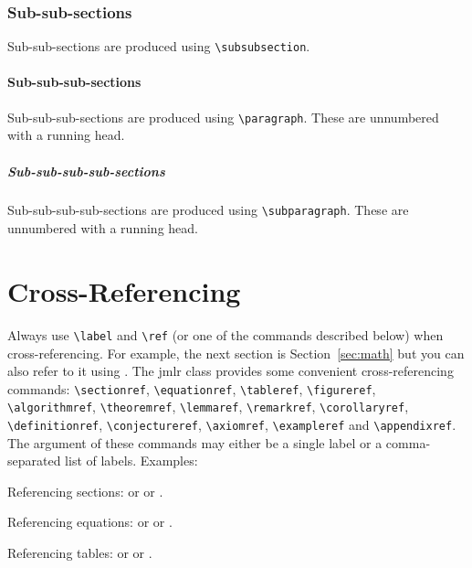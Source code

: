 \documentclass[pmlr,twocolumn,10pt]{jmlr} %
\begin{document}
\subsubsection{Sub-sub-sections}

Sub-sub-sections are produced using \verb|\subsubsection|.

\paragraph{Sub-sub-sub-sections}

Sub-sub-sub-sections are produced using \verb|\paragraph|.
These are unnumbered with a running head.

\subparagraph{Sub-sub-sub-sub-sections}

Sub-sub-sub-sub-sections are produced using \verb|\subparagraph|.
These are unnumbered with a running head.

\section{Cross-Referencing}

Always use \verb|\label| and \verb|\ref| (or one of the commands
described below) when cross-referencing.  For example, the next
section is Section~\ref{sec:math} but you can also refer to it using
. The \textsf{jmlr} class
provides some convenient cross-referencing commands:
\verb|\sectionref|, \verb|\equationref|, \verb|\tableref|,
\verb|\figureref|, \verb|\algorithmref|, \verb|\theoremref|,
\verb|\lemmaref|, \verb|\remarkref|, \verb|\corollaryref|,
\verb|\definitionref|, \verb|\conjectureref|, \verb|\axiomref|,
\verb|\exampleref| and \verb|\appendixref|. The argument of these
commands may either be a single label or a comma-separated list
of labels. Examples:

Referencing sections:  or
 or
.

Referencing equations:  or
 or
.

Referencing tables:  or
 or
.
\end{document}
